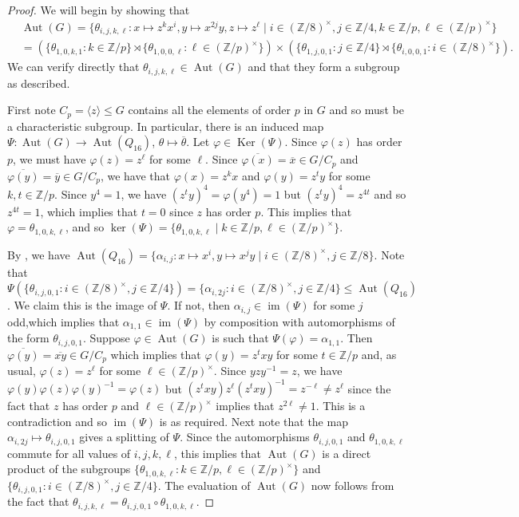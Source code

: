 \documentclass[11pt,leqno,a4paper]{amsart}
\newcommand{\Z}{\mathbb{Z}}
\DeclareMathOperator{\Aut}{Aut}
\DeclareMathOperator{\IM}{im}
\DeclareMathOperator{\Ker}{Ker}
\theoremstyle{definition}
\theoremstyle{remark}
\theoremstyle{custom}
\begin{document}
\begin{proof}
We will begin by showing that
    \begin{align*} &\Aut(G) = \{ \theta_{i,j,k,\ell} : x \mapsto z^kx^i, y \mapsto x^{2j}y, z \mapsto z^\ell \mid i \in (\Z/8)^\times, j \in \Z/4, k \in \Z/p, \ell \in (\Z/p)^\times \} \\
&= (\{ \theta_{1,0,k,1} : k \in \Z/p \} \rtimes \{ \theta_{1,0,0,\ell} : \ell \in (\Z/p)^\times \}) \times (\{ \theta_{1,j,0,1} : j \in \Z/4 \} \rtimes \{ \theta_{i,0,0,1} : i \in (\Z/8)^\times \}).
\end{align*} 
We can verify directly that $\theta_{i,j,k,\ell} \in \Aut(G)$ and that they form a subgroup as described.

First note $C_p =\langle z \rangle \le G$ contains all the elements of order $p$ in $G$ and so must be a characteristic subgroup. In particular, there is an induced map $\Psi: \Aut(G) \to \Aut(Q_{16})$, $\theta \mapsto \overline{\theta}$.
Let $\varphi \in \Ker(\Psi)$.
Since $\varphi(z)$ has order $p$, we must have $\varphi(z)=z^\ell$ for some $\ell$.
Since $\overline{\varphi(x)}=\overline{x} \in G/C_p$ and $\overline{\varphi(y)}=\overline{y} \in G/C_p$, we have that $\varphi(x)=z^kx$ and $\varphi(y)=z^ty$ for some $k, t \in \Z/p$. Since $y^4=1$, we have $(z^ty)^4 = \varphi(y^4)= 1$ but $(z^ty)^4=z^{4t}$ and so $z^{4t}=1$, which implies that $t=0$ since $z$ has order $p$. This implies that $\varphi = \theta_{1,0,k,\ell}$, and so $\ker(\Psi) = \{\theta_{1,0,k,\ell} \mid k \in \Z/p,\ell \in (\Z/p)^\times\}$.

By \cite[Proposition 8.2]{Sw60-II}, we have
$\Aut(Q_{16}) = \{ \alpha_{i,j} : x \mapsto x^i, y \mapsto x^jy \mid i \in (\Z/8)^\times, j \in \Z/8\}$.
Note that $\Psi(\{\theta_{i,j,0,1} : i \in (\Z/8)^\times, j \in \Z/4\}) = \{ \alpha_{i,2j} : i \in (\Z/8)^\times, j \in \Z/4\} \le \Aut(Q_{16})$.
We claim this is the image of $\Psi$. If not, then $\alpha_{i,j} \in \IM(\Psi)$ for some $j$ odd,which implies that $\alpha_{1,1} \in \IM(\Psi)$ by composition with automorphisms of the form $\theta_{i,j,0,1}$. Suppose $\varphi \in \Aut(G)$ is such that $\Psi(\varphi) = \alpha_{1,1}$. Then $\overline{\varphi(y)}=\overline{xy} \in G/C_p$ which implies that $\varphi(y)=z^txy$ for some $t \in \Z/p$ and, as usual, $\varphi(z)=z^\ell$ for some $\ell \in (\Z/p)^\times$. Since $yzy^{-1}=z$, we have $\varphi(y)\varphi(z)\varphi(y)^{-1}=\varphi(z)$ but $(z^txy)z^\ell(z^txy)^{-1} = z^{-\ell} \ne z^{\ell}$ since the fact that $z$ has order $p$ and $\ell \in (\Z/p)^\times$ implies that $z^{2\ell}\ne 1$. This is a contradiction and so $\IM(\Psi)$ is as required. 
Next note that the map $\alpha_{i,2j} \mapsto \theta_{i,j,0,1}$ gives a splitting of $\Psi$. Since the automorphisms $\theta_{i,j,0,1}$ and $\theta_{1,0,k,\ell}$ commute for all values of $i,j,k,\ell$, this implies that $\Aut(G)$ is a direct product of the subgroups $\{\theta_{1,0,k,\ell} : k \in \Z/p, \ell \in (\Z/p)^\times\}$ and $\{ \theta_{i,j,0,1} : i \in (\Z/8)^\times, j \in \Z/4\}$. The evaluation of $\Aut(G)$ now follows from the fact that $\theta_{i,j,k,\ell} = \theta_{i,j,0,1} \circ \theta_{1,0,k,\ell}$.


\end{proof}
\end{document}
